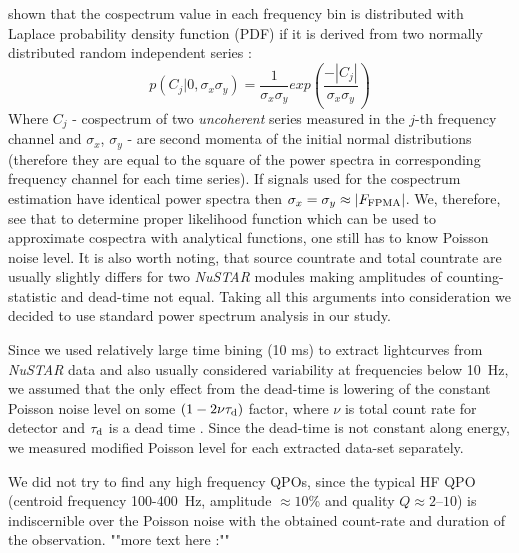 \documentclass[a4paper,fleqn,usenatbib]{mnras}
\begin{document}
\citet{2017arXiv170909666H} shown that the cospectrum value in each frequency bin is distributed with Laplace probability density function (PDF) if it is derived from two normally distributed random independent series \citep[see, e.q. 14 in ][]{2017arXiv170909666H}:
\begin{equation}
        p(C_{j}|0, \sigma_x \sigma_y) = \frac{1}{\sigma_x \sigma_y} exp{\left(\frac{-|C_{j}|}{\sigma_x \sigma_y} \right)}
\end{equation}
Where $C_{j}$ - cospectrum of two {\it uncoherent} series measured in the $j$-th frequency channel and $\sigma_x$, $\sigma_y$ - are second momenta of the initial normal distributions (therefore they are equal to the square of the power spectra in corresponding frequency channel for each time series).
If signals used for the cospectrum estimation have identical power spectra then $\sigma_x = \sigma_y \approx |F_{\rm FPMA}|$.
We, therefore, see that to determine proper likelihood function which can be used to approximate cospectra with analytical functions, one still has to know Poisson noise level.
It is also worth noting, that source countrate and total countrate are usually slightly differs for two {\it NuSTAR} modules making amplitudes of counting-statistic and dead-time not equal.
Taking all this arguments into consideration we decided to use standard power spectrum analysis in our study.

Since we used relatively large time bining (10 ms) to extract lightcurves from {\it NuSTAR} data and also usually considered variability at frequencies below 10~Hz, we assumed that the only effect from the dead-time is lowering of the constant Poisson noise level on some $(1 - 2\nu \tau_{\rm d})$ factor, where $\nu$ is total count rate for detector and $\tau_{\rm d}$ is a dead time \citep{1994A&A...287...73V, 1995ApJ...449..930Z}. 
Since the dead-time is not constant along energy, we measured modified Poisson level for each extracted data-set separately.

We did not try to find any high frequency QPOs, since the typical HF QPO (centroid frequency 100-400~Hz, amplitude $\approx10$\% and quality $Q\approx2$--$10$) is indiscernible over the Poisson noise with the obtained count-rate and duration of the observation.
""more text here :""
\end{document}
